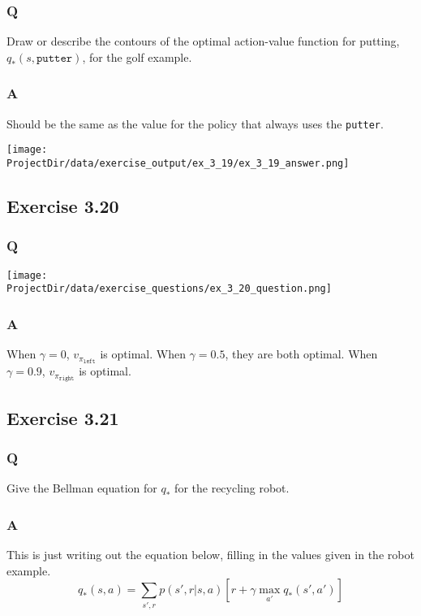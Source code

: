 \subsubsection{Q}
 Draw or describe the contours of the optimal action-value function for putting, $q_*(s, \mathtt{putter})$, for the golf example.

\subsubsection{A}
Should be the same as the value for the policy that always uses the \texttt{putter}.

\texttt{[image: \\ProjectDir/data/exercise\_output/ex\_3\_19/ex\_3\_19\_answer.png]}


\subsection{Exercise 3.20}
\subsubsection{Q}
\texttt{[image: \\ProjectDir/data/exercise\_questions/ex\_3\_20\_question.png]}
 
\subsubsection{A}
When $\gamma=0$, $v_{\pi_{\mathtt{left}}}$ is optimal. When $\gamma = 0.5$, they are both optimal. When $\gamma=0.9$, $v_{\pi_{\mathtt{right}}}$ is optimal.

\subsection{Exercise 3.21}
\subsubsection{Q}
Give the Bellman equation for $q_*$ for the recycling robot.

\subsubsection{A}
This is just writing out the equation below, filling in the values given in the robot example.
\begin{equation}
    q_*(s, a) = \sum_{s', r} p(s', r | s, a)[r + \gamma \max_{a'} q_*(s', a')]
\end{equation}

